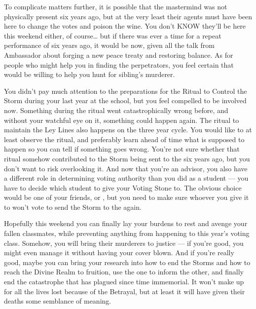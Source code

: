 \documentclass[char]{GL2020}
\begin{document}
To complicate matters further, it is possible that the mastermind was not physically present six years ago, but at the very least their agents must have been here to change the votes and poison the wine. You don't KNOW they'll be here this weekend either, of course\ldots{} but if there was ever a time for a repeat performance of six years ago, it would be now, given all the talk from Ambassador \cHeadDiplomat{\full} about forging a new peace treaty and restoring balance. As for people who might help you in finding the perpetrators, you feel certain that \cHeir{} would be willing to help you hunt for \cHeir{\their} sibling’s murderer. 

You didn't pay much attention to the preparations for the Ritual to Control the Storm during your last year at the school, but you feel compelled to be involved now. Something during the ritual went catastrophically wrong before, and without your watchful eye on it, something could happen again. The ritual to maintain the Ley Lines also happens on the three year cycle. You would like to at least observe the ritual, and preferably learn ahead of time what is supposed to happen so you can tell if something goes wrong. You're not sure whether that ritual somehow contributed to the Storm being sent to the \pShip{} six years ago, but you don't want to risk overlooking it. And now that you're an advisor, you also have a different role in determining voting authority than you did as a student — you have to decide which student to give your Voting Stone to. The obvious choice would be one of your friends, \cHeir{} or \cTechStar{}, but you need to make sure whoever you give it to won’t vote to send the Storm to the \pShippies{} again. 

Hopefully this weekend you can finally lay your burdens to rest and avenge your fallen classmates, while preventing anything from happening to this year's voting class. Somehow, you will bring their murderers to justice — if you're good, you might even manage it without having your cover blown. And if you’re really good, maybe you can bring your research into how to end the Storms and how to reach the Divine Realm to fruition, use the one to inform the other, and finally end the catastrophe that has plagued \pEarth{} since time immemorial. It won’t make up for all the lives lost because of the Betrayal, but at least it will have given their deaths some semblance of meaning. 
\end{document}
